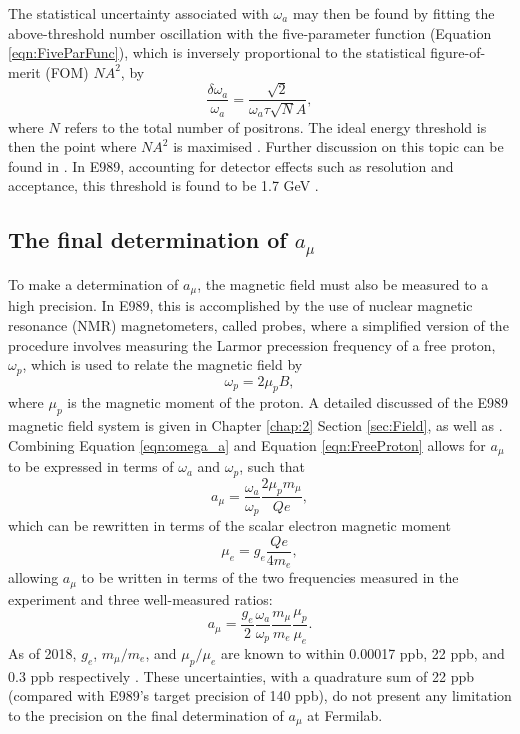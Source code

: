 The statistical uncertainty associated with $\omega_{a}$ may then be found by fitting the above-threshold number oscillation with the five-parameter function (Equation \ref{eqn:FiveParFunc}), which is inversely proportional to the statistical figure-of-merit (FOM) $NA^{2}$, by 
%
\begin{equation}
  \frac{\delta\omega_{a}}{\omega_{a}} = \frac{\sqrt{2}}{\omega_{a}\tau\sqrt{N}A},
  \label{eqn:OmegaAStatUnc}
\end{equation}
%
where $N$ refers to the total number of positrons. The ideal energy threshold is then the point where $NA^{2}$ is maximised \cite{BNLStatMethods}. Further discussion on this topic can be found in \cite{Miller_2007}. In E989, accounting for detector effects such as resolution and acceptance, this threshold is found to be 1.7 GeV \cite{OmegaARun1}.

\subsection{The final determination of $a_{\mu}$}

To make a determination of $a_{\mu}$, the magnetic field must also be measured to a high precision. In E989, this is accomplished by the use of nuclear magnetic resonance (NMR) magnetometers, called probes, where a simplified version of the procedure involves measuring the Larmor precession frequency of a free proton, $\omega_{p}$, which is used to relate the magnetic field by 
%
\begin{equation}
  \omega_{p} = 2\mu_{p} B, 
  \label{eqn:FreeProton}
\end{equation}
%
where $\mu_{p}$ is the magnetic moment of the proton. A detailed discussed of the E989 magnetic field system is given in Chapter \ref{chap:2} Section \ref{sec:Field}, as well as \cite{Field}. Combining Equation \ref{eqn:omega_a} and Equation \ref{eqn:FreeProton} allows for $a_{\mu}$ to be expressed in terms of $\omega_{a}$ and $\omega_{p}$, such that
%
\begin{equation}
  a_{\mu} = \frac{\omega_{a}}{\omega_{p}} \frac{2\mu_{p}m_{\mu}}{Qe}, 
\end{equation}
%
which can be rewritten in terms of the scalar electron magnetic moment
%
\begin{equation}
  \mu_{e} = g_{e}\frac{Qe}{4m_{e}}, 
\end{equation}
%
allowing $a_{\mu}$ to be written in terms of the two frequencies measured in the experiment and three well-measured ratios: 
%
\begin{equation}
  a_{\mu}=\frac{g_{e}}{2}\frac{\omega_{a}}{\omega_{p}}\frac{m_{\mu}}{m_{e}}\frac{\mu_{p}}{\mu_{e}}.
  \label{eqn:a_mu}
\end{equation}
%
As of 2018, $g_{e}$, $m_{\mu}/m_{e}$, and $\mu_{p}/\mu_{e}$ are known to within 0.00017 ppb, 22 ppb, and 0.3 ppb respectively \cite{CODATA_2018}. These uncertainties, with a quadrature sum of 22 ppb (compared with E989's target precision of 140 ppb), do not present any limitation to the precision on the final determination of $a_{\mu}$ at Fermilab. 

